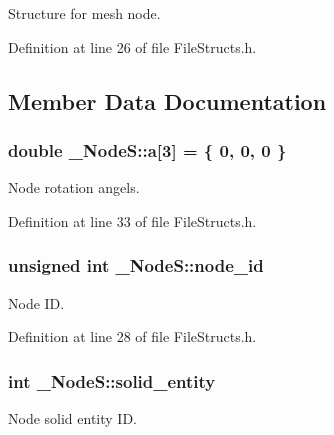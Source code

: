 Structure for mesh node. 

Definition at line 26 of file File\+Structs.\+h.



\subsection{Member Data Documentation}
\subsubsection[{\texorpdfstring{a}{a}}]{\setlength{\rightskip}{0pt plus 5cm}double \+\_\+\+Node\+S\+::a\mbox{[}3\mbox{]} = \{ 0, 0, 0 \}}\hypertarget{struct___node_s_a4af2fedf51326cedd3244b54a0684935}{}\label{struct___node_s_a4af2fedf51326cedd3244b54a0684935}


Node rotation angels. 



Definition at line 33 of file File\+Structs.\+h.

\subsubsection[{\texorpdfstring{node\+\_\+id}{node_id}}]{\setlength{\rightskip}{0pt plus 5cm}unsigned int \+\_\+\+Node\+S\+::node\+\_\+id}\hypertarget{struct___node_s_a03170eedacfbc42024a0e556858ead3f}{}\label{struct___node_s_a03170eedacfbc42024a0e556858ead3f}


Node ID. 



Definition at line 28 of file File\+Structs.\+h.

\subsubsection[{\texorpdfstring{solid\+\_\+entity}{solid_entity}}]{\setlength{\rightskip}{0pt plus 5cm}int \+\_\+\+Node\+S\+::solid\+\_\+entity}\hypertarget{struct___node_s_a9ded714a4c7575d4dc9c721f8560f861}{}\label{struct___node_s_a9ded714a4c7575d4dc9c721f8560f861}


Node solid entity ID. 



